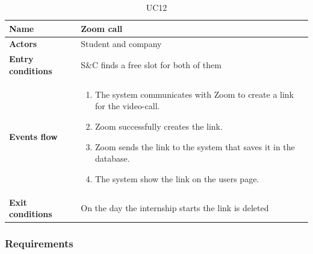 \begin{table}[H]
\renewcommand\arraystretch{1.25}
    \centering
    \begin{tabular}{|l|p{12 cm}|}
    \hline
    \textbf{Name} & Zoom call \\
    \hline
    \textbf{Actors} & Student and company\\
    \hline
    \textbf{Entry conditions} & S\&C finds a free slot for both of them\\
    \hline
    \textbf{Events flow} &
    \begin{enumerate}
        \item The system communicates with Zoom to create a link for the video-call.
        \item Zoom successfully creates the link.
        \item Zoom sends the link to the system that saves it in the database.
        \item The system show the link on the users page.
    \end{enumerate}\\  
    \hline
    \textbf{Exit conditions} & On the day the internship starts the link is deleted\\
    \hline
    \end{tabular}
    \caption{UC12}
    \label{UC12}
\end{table}

\subsubsection{Requirements}

